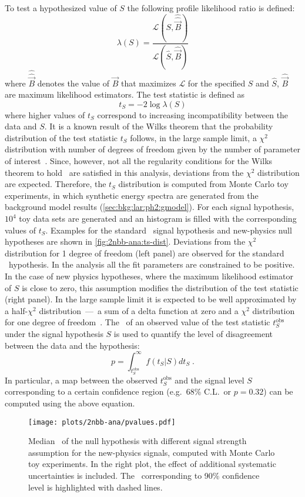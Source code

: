 To test a hypothesized value of $S$ the following profile likelihood ratio is defined:
\[
  \lambda(S) = \frac{\mathcal{L}(S, \hat{\hat{\vec{B}}})}{\mathcal{L}(\hat{S}, \hat{\vec{B}})}
\]
where $\hat{\hat{\vec{B}}}$ denotes the value of $\vec{B}$ that maximizes $\mathcal{L}$
for the specified $S$ and $\hat{S}$, $\hat{\vec{B}}$ are maximum likelihood
estimators. The test statistic is defined as
\[
  t_S = -2\log\lambda(S)
\]
where higher values of $t_S$ correspond to increasing incompatibility between the data and
$S$. It is a known result of the Wilks theorem that the probability distribution of the
test statistic $t_S$ follows, in the large sample limit, a $\chi^2$ distribution with
number of degrees of freedom given by the number of parameter of
interest~\cite{Cowan2011}.  Since, however, not all the regularity conditions for the
Wilks theorem to hold~\cite{Algeri2020} are satisfied in this analysis, deviations from
the $\chi^2$ distribution are expected. Therefore, the $t_S$ distribution is computed from
Monte Carlo toy experiments, in which synthetic energy spectra are generated from the
background model results (\cref{sec:bkg:lar:ph2:gmodel}). For each signal hypothesis,
$10^4$ toy data sets are generated and an histogram is filled with the corresponding
values of $t_S$. Examples for the standard \nnbb\ signal hypothesis and new-physics
null hypotheses are shown in \cref{fig:2nbb-ana:ts-dist}. Deviations from the $\chi^2$
distribution for 1 degree of freedom (left panel) are observed for the standard \nnbb\
hypothesis. In the analysis all the fit parameters are constrained to be positive. In the
case of new physics hypotheses, where the maximum likelihood estimator of $S$ is close to
zero, this assumption modifies the distribution of the test statistic (right panel). In
the large sample limit it is expected to be well approximated by a half-$\chi^2$
distribution~---~a sum of a delta function at zero and a $\chi^2$ distribution for one
degree of freedom~\cite{Cowan2011}.
\newpar
The \pvalue\ of an observed value of the test statistic $t_S^\text{obs}$ under the signal
hypothesis $S$ is used to quantify the level of disagreement between the data and the
hypothesis:
\[
  p = \int_{t_S^\text{obs}}^\infty f(t_S | S) dt_S \;.
\]
In particular, a map between the observed $t_S^\text{obs}$ and the signal level $S$
corresponding to a certain confidence region (e.g.~68\% C.L.~or $p=0.32$) can be computed
using the above equation.

\begin{figure}
  \centering
  \texttt{[image: plots/2nbb-ana/pvalues.pdf]}
  \caption{%
    Median \pvalue\ of the null hypothesis with different signal strength assumption for
    the new-physics signals, computed with Monte Carlo toy experiments. In the right
    plot, the effect of additional systematic uncertainties is included. The \pvalue\
    corresponding to 90\% confidence level is highlighted with dashed lines. 
  }\label{fig:2nbb-ana:pvalues}
\end{figure}

